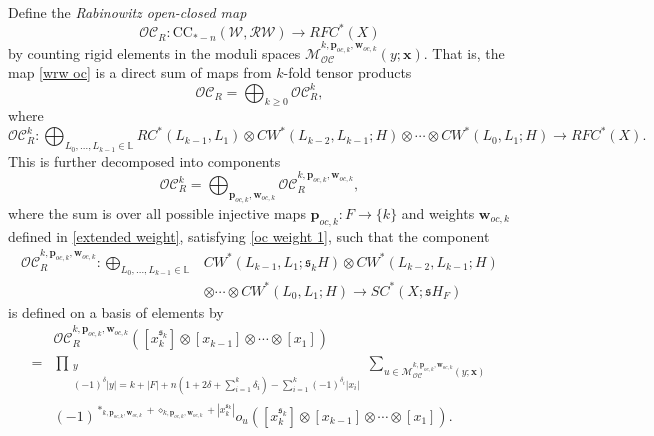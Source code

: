 \documentclass[11pt]{amsproc}
\def\L{{\mathbb L}}
\def\w{\mathcal{W}(E)}
\def\oc{\mathcal{OC}}
\def\r#1{\mathrm{#1}}
\def\w{\mathcal{W}}
\def\rw{\mathcal{RW}}
\def\d{\delta}
\def\M{\mathcal{M}}
\def\sk{\mathfrak{s}}
\theoremstyle{remark}
\numberwithin{equation}{section}
\begin{document}
Define the {\it Rabinowitz open-closed map}
\begin{equation}\label{wrw oc}
\oc_{R}: \r{CC}_{*-n}(\w, \rw) \to RFC^{*}(X)
\end{equation}
by counting rigid elements in the moduli spaces $\M_{\oc}^{k, \mathbf{p}_{oc, k}, \mathbf{w}_{oc, k}}(y; \mathbf{x})$.
That is, the map \eqref{wrw oc} is a direct sum of maps from $k$-fold tensor products
\begin{equation}
\oc_{R} = \bigoplus_{k \ge 0} \oc_{R}^{k},
\end{equation}
 where
 \begin{equation}
 \oc_{R}^{k}: \bigoplus_{L_{0}, \ldots, L_{k-1} \in \L} RC^{*}(L_{k-1}, L_{1}) \otimes CW^{*}(L_{k-2}, L_{k-1}; H) \otimes \cdots \otimes CW^{*}(L_{0}, L_{1}; H) \to RFC^{*}(X).
 \end{equation}
 This is further decomposed into components 
 \begin{equation}
 \oc_{R}^{k} = \bigoplus_{\mathbf{p}_{oc, k}, \mathbf{w}_{oc, k}} \oc_{R}^{k, \mathbf{p}_{oc, k}, \mathbf{w}_{oc, k}},
 \end{equation}
 where the sum is over all possible injective maps $\mathbf{p}_{oc, k}: F \to \{k\}$ and weights $\mathbf{w}_{oc, k}$ defined in \eqref{extended weight}, 
 satisfying \eqref{oc weight 1}, such that the component
 \begin{equation}
 \begin{split}
 \oc_{R}^{k, \mathbf{p}_{oc, k}, \mathbf{w}_{oc, k}}: \bigoplus_{L_{0}, \ldots, L_{k-1} \in \L} & CW^{*}(L_{k-1}, L_{1}; \sk_{k}H) \otimes CW^{*}(L_{k-2}, L_{k-1}; H)\\
 & \otimes \cdots \otimes CW^{*}(L_{0}, L_{1}; H) \to SC^{*}(X; \sk H_{F})
 \end{split}
 \end{equation}
 is defined on a basis of elements by
\begin{equation}\label{components of rw oc}
\begin{split}
&\oc_{R}^{k, \mathbf{p}_{oc, k}, \mathbf{w}_{oc, k}}([x_{k}^{\sk_{k}}] \otimes [x_{k-1}] \otimes \cdots \otimes [x_{1}])\\
= & \prod_{\substack{y\\ (-1)^{\d}|y| = k + |F| + n(1+2\d+\sum_{i=1}^{k}\d_{i}) - \sum_{i=1}^{k} (-1)^{\d_{i}}|x_{i}|}} \sum_{u \in \M_{\oc}^{k, \mathbf{p}_{oc, k}, \mathbf{w}_{oc, k}}(y; \mathbf{x})} \\
&(-1)^{*_{k, \mathbf{p}_{oc, k}, \mathbf{w}_{oc, k}} + \diamond_{k, \mathbf{p}_{oc, k}, \mathbf{w}_{oc, k}} + |x_{k}^{\sk_{k}}|} o_{u}([x_{k}^{\sk_{k}}] \otimes [x_{k-1}] \otimes \cdots \otimes [x_{1}]).
\end{split}
\end{equation}
\end{document}
